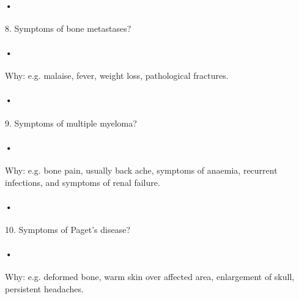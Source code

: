 \documentclass[12pt]{article}
\begin{document}
\paragraph{•}8. Symptoms of bone metastases?
\paragraph{•}Why: e.g. malaise, fever, weight loss, pathological fractures.

\paragraph{•}9. Symptoms of multiple myeloma?
\paragraph{•}Why: e.g. bone pain, usually back ache, symptoms of anaemia, recurrent infections, and symptoms of renal failure.


\paragraph{•}10. Symptoms of Paget's disease?
\paragraph{•}Why: e.g. deformed bone, warm skin over affected area, enlargement of skull, persistent headaches.
\end{document}
